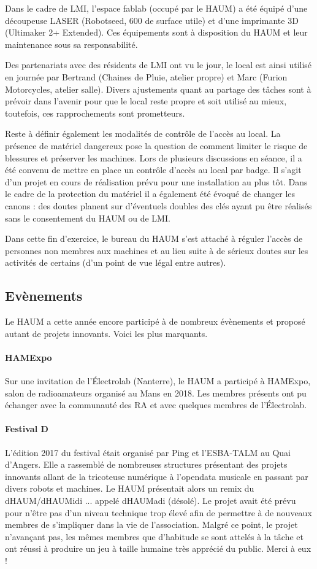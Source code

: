 \documentclass[11pt]{article}
\begin{document}
Dans le cadre de LMI, l'espace fablab (occupé par le HAUM) a été équipé
d'une découpeuse LASER (Robotseed, 600 de surface utile) et d'une imprimante 3D
(Ultimaker 2+ Extended). Ces équipements sont à disposition du HAUM et leur maintenance
sous sa responsabilité.

Des partenariats avec des résidents de LMI ont vu le jour, le local est ainsi utilisé en
journée par Bertrand (Chaines de Pluie, atelier propre) et Marc (Furion Motorcycles,
atelier salle). Divers ajustements quant au partage des tâches sont à prévoir dans
l'avenir pour que le local reste propre et soit utilisé au mieux, toutefois, ces
rapprochements sont prometteurs.

Reste à définir également les modalités de contrôle de l'accès au local. La présence de
matériel dangereux pose la question de comment limiter le risque de blessures et préserver
les machines. Lors de plusieurs discussions en séance, il a été convenu de mettre en place
un contrôle d'accès au local par badge. Il s'agit d'un projet en cours de réalisation
prévu pour une installation au plus tôt. Dans le cadre de la protection du matériel il a
également été évoqué de changer les canons : des doutes planent sur d'éventuels doubles
des clés ayant pu être réalisés sans le consentement du HAUM ou de LMI.

Dans cette fin d'exercice, le bureau du HAUM s'est attaché à réguler l'accès de personnes
non membres aux machines et au lieu suite à de sérieux doutes sur les activités de
certains (d'un point de vue légal entre autres).

\subsection{Evènements}

Le HAUM a cette année encore participé à de nombreux évènements et proposé autant de
projets innovants. Voici les plus marquants.

\paragraph{HAMExpo} Sur une invitation de l'Électrolab (Nanterre), le HAUM a participé à
HAMExpo, salon de radioamateurs organisé au Mans en 2018. Les membres présents ont pu
échanger avec la communauté des RA et avec quelques membres de l'Électrolab.

\paragraph{Festival D} L'édition 2017 du festival était organisé par Ping et l'ESBA-TALM
au Quai d'Angers. Elle a rassemblé de nombreuses structures présentant des projets
innovants allant de la tricoteuse numérique à l'opendata musicale en passant par divers
robots et machines. Le HAUM présentait alors un remix du dHAUM/dHAUMidi ... appelé
dHAUMadi (désolé). Le projet avait été prévu pour n'être pas d'un niveau technique trop
élevé afin de permettre à de nouveaux membres de s'impliquer dans la vie de l'association.
Malgré ce point, le projet n'avançant pas, les mêmes membres que d'habitude se sont
attelés à la tâche et ont réussi à produire un jeu à taille humaine très apprécié du
public. Merci à eux !
\end{document}
